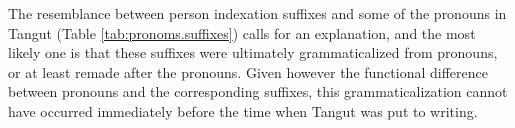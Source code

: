 \documentclass[oldfontcommands,oneside,a4paper,11pt]{article}
\newcommand{\ipa}[1]{{\phon \mbox{#1}}} %
\begin{document}
The resemblance between person indexation suffixes and some of the pronouns in Tangut (Table \ref{tab:pronoms.suffixes}) calls for an explanation, and the most likely one is that these suffixes were ultimately  grammaticalized from pronouns, or at least remade after the pronouns. Given however the functional difference between pronouns and the corresponding suffixes, this grammaticalization cannot have occurred immediately before the time when Tangut was put to writing.

%
%
%
\end{document}
